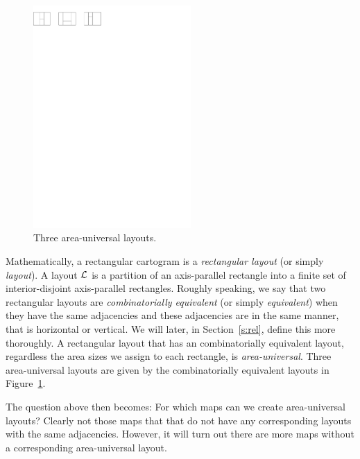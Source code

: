 \pagebreak[2]
  \begin{figure} %
    \centering
    \includegraphics[width = 6cm]{introduction/img/areaunivLayout.pdf}
    \caption{Three area-universal layouts.}
    \label{fig:intro:areaunivLayout}
  \end{figure}
  Mathematically, a rectangular cartogram is a  \emph{rectangular layout} (or simply \emph{layout}).
  A layout $\mathcal{L}$ is a partition of an axis-parallel rectangle into a finite set of interior-disjoint axis-parallel rectangles.
  Roughly speaking, we say that two rectangular layouts are \emph{combinatorially equivalent} (or simply \emph{equivalent}) when they have the same adjacencies and these adjacencies are in the same manner, that is horizontal or vertical. We will later, in Section~\ref{s:rel}, define this more thoroughly.
  A rectangular layout that has an combinatorially equivalent layout, regardless the area sizes we assign to each rectangle, is \emph{area-universal}. Three area-universal layouts are given by the  combinatorially equivalent layouts in Figure~\ref{fig:intro:areaunivLayout}.

  The question above then becomes: For which maps can we create area-universal layouts?
  Clearly not those maps that that do not have any corresponding layouts with the same adjacencies. However, it will turn out there are more maps without a corresponding area-universal layout.

